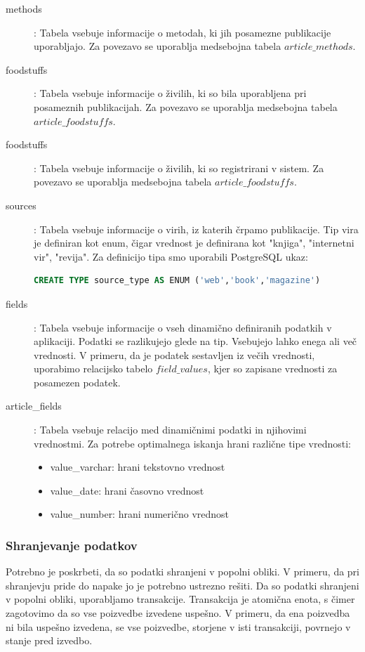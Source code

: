 \documentclass[a4paper, 12pt]{book}
\begin{document}
\begin{description}
\item[methods]: Tabela vsebuje informacije o metodah, ki jih posamezne publikacije uporabljajo. Za povezavo se uporablja medsebojna tabela $article\_methods$.

\item[foodstuffs]: Tabela vsebuje informacije o živilih, ki so bila uporabljena pri posameznih publikacijah. Za povezavo se uporablja medsebojna tabela $article\_foodstuffs$.

\item[foodstuffs]: Tabela vsebuje informacije o živilih, ki so registrirani v sistem. Za povezavo se uporablja medsebojna tabela $article\_foodstuffs$.

\item[sources]: Tabela vsebuje informacije o virih, iz katerih črpamo publikacije. Tip vira je definiran kot enum, čigar vrednost je definirana kot "knjiga", "internetni vir", "revija". Za definicijo tipa smo uporabili PostgreSQL ukaz:
\begin{lstlisting}[language=sql, style=mystyle]
CREATE TYPE source_type AS ENUM ('web','book','magazine')
\end{lstlisting}

\item[fields]: Tabela vsebuje informacije o vseh dinamično definiranih podatkih v aplikaciji. Podatki se razlikujejo glede na tip. Vsebujejo lahko enega ali več vrednosti. V primeru, da je podatek sestavljen iz večih vrednosti, uporabimo relacijsko tabelo $field\_values$, kjer so zapisane vrednosti za posamezen podatek.

\item[article\_fields]: Tabela vsebuje relacijo med dinamičnimi podatki in njihovimi vrednostmi. Za potrebe optimalnega iskanja hrani različne tipe vrednosti: 
\begin{itemize}
    \item value\_varchar: hrani tekstovno vrednost 
    \item value\_date: hrani časovno vrednost
    \item value\_number: hrani numerično vrednost
\end{itemize}
\end{description}

\subsubsection{Shranjevanje podatkov}
Potrebno je poskrbeti, da so podatki shranjeni v popolni obliki. V primeru, da pri shranjevju pride do napake jo je potrebno ustrezno rešiti. Da so podatki shranjeni v popolni obliki, uporabljamo transakcije. Transakcija je atomična enota, s čimer zagotovimo da so vse poizvedbe izvedene uspešno. V primeru, da ena poizvedba ni bila uspešno izvedena, se vse poizvedbe, storjene v isti transakciji, povrnejo v stanje pred izvedbo. 
\end{document}
